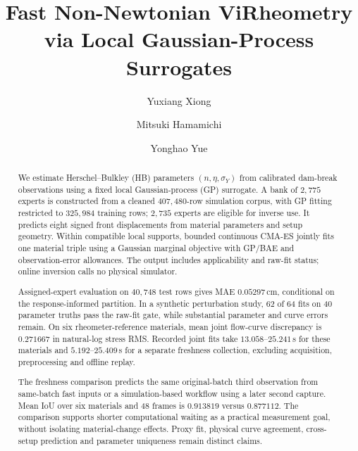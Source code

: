 \documentclass[acmtog,anonymous,review]{acmart}
\begin{document}
\title{Fast Non-Newtonian ViRheometry via Local Gaussian-Process Surrogates}

\author{Yuxiang Xiong}
\author{Mitsuki Hamamichi}
\author{Yonghao Yue}

\renewcommand\shortauthors{Xiong, Y. et al.}

\begin{abstract}
We estimate Herschel--Bulkley (HB) parameters $(n,\eta,\sigma_Y)$
from calibrated dam-break observations using a fixed local
Gaussian-process (GP) surrogate. A bank of $2{,}775$ experts is constructed from a cleaned
$407{,}480$-row simulation corpus, with GP fitting restricted to
$325{,}984$ training rows; $2{,}735$ experts are eligible for inverse use. It predicts eight signed front displacements
from material parameters and setup geometry. Within compatible local
supports, bounded continuous CMA-ES jointly fits one material triple
using a Gaussian marginal objective with GP/BAE and observation-error
allowances. The output includes applicability and raw-fit status;
online inversion calls no physical simulator.

Assigned-expert evaluation on $40{,}748$ test rows gives MAE
$0.05297$\,cm, conditional on the response-informed partition.
In a synthetic perturbation study, 62 of 64 fits on 40 parameter
truths pass the raw-fit gate, while substantial parameter and curve
errors remain. On six rheometer-reference materials, mean joint
flow-curve discrepancy is $0.271667$ in natural-log stress RMS.
Recorded joint fits take $13.058$--$25.241$\,s for these materials
and $5.192$--$25.409$\,s for a separate freshness collection, excluding
acquisition, preprocessing and offline replay.

The freshness comparison predicts the same original-batch third
observation from same-batch fast inputs or a simulation-based workflow
using a later second capture. Mean IoU over six materials
and 48 frames is $0.913819$ versus $0.877112$. The comparison supports
shorter computational waiting as a practical measurement goal, without
isolating material-change effects. Proxy fit, physical curve agreement,
cross-setup prediction and parameter uniqueness remain distinct claims.

\end{abstract}
\end{document}
